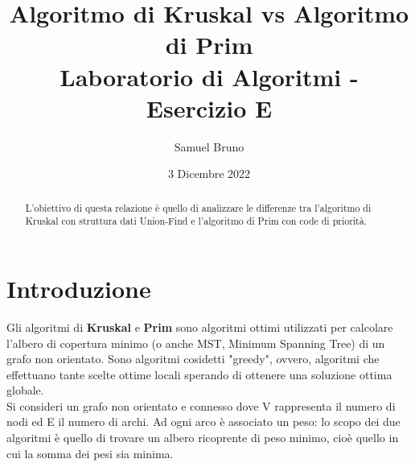 \documentclass{article}
\title{Algoritmo di Kruskal vs Algoritmo di Prim \\
       \large Laboratorio di Algoritmi - Esercizio E}
\author{Samuel Bruno}
\date{3 Dicembre 2022}
\begin{document}
\maketitle

\begin{abstract}
L'obiettivo di questa relazione è quello di analizzare le differenze tra l'algoritmo di Kruskal con struttura dati Union-Find e l'algoritmo di Prim con code di priorità.
\end{abstract}

\section{Introduzione}
Gli algoritmi di \textbf{Kruskal} e \textbf{Prim} sono algoritmi ottimi utilizzati per calcolare l'albero di copertura minimo (o anche MST, Minimum Spanning Tree) di un grafo non orientato. 
Sono algoritmi cosidetti "greedy", ovvero, algoritmi che effettuano tante scelte ottime locali
sperando di ottenere una soluzione ottima
globale. \\
Si consideri un grafo non orientato e connesso dove V rappresenta il numero di nodi ed E il numero di archi. Ad ogni arco è associato un peso: lo scopo dei due algoritmi è quello di trovare un albero ricoprente di peso minimo, cioè quello in cui la somma dei pesi sia minima. 
\end{document}
